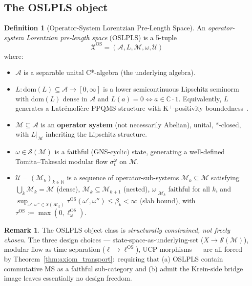 \documentclass[11pt,a4paper]{article}
\theoremstyle{plain}
\theoremstyle{definition}
\newtheorem{definition}[theorem]{Definition}
\newtheorem{remark}[theorem]{Remark}
\newcommand{\Acal}{\mathcal{A}}
\newcommand{\Scal}{\mathcal{S}}
\newcommand{\Mcal}{\mathcal{M}}
\newcommand{\Ucal}{\mathcal{U}}
\newcommand{\C}{\mathbb{C}}
\newcommand{\N}{\mathbb{N}}
\newcommand{\ellOS}{\ell^{\mathrm{OS}}}
\newcommand{\tauOS}{\tau^{\mathrm{OS}}}
\newcommand{\Xfrak}{\mathfrak{X}^{\mathrm{OS}}}
\begin{document}
\subsection{The OSLPLS object}\label{sec:oslpls_object}

\begin{definition}[Operator-System Lorentzian Pre-Length Space]
\label{def:oslpls_object}
An \emph{operator-system Lorentzian pre-length space} (OSLPLS) is a
5-tuple
\[
  \Xfrak = (\Acal,L,\Mcal,\omega,\Ucal)
\]
where:
\begin{itemize}
\item[\textbf{(A1)}] $\Acal$ is a separable unital C*-algebra (the
underlying algebra).
\item[\textbf{(A2)}] $L:\mathrm{dom}(L)\subseteq\Acal\to[0,\infty]$ is
a lower semicontinuous Lipschitz seminorm with $\mathrm{dom}(L)$ dense
in $\Acal$ and $L(a)=0\iff a\in\C\cdot 1$. Equivalently, $L$ generates
a Latr\'emoli\`ere PPQMS structure with K$^{+}$-positivity
boundedness~\cite{latremoliere2025_hypertopology, paper48}.
\item[\textbf{(A3)}] $\Mcal\subseteq\Acal$ is an \textbf{operator
system} (not necessarily Abelian), unital, *-closed, with $L|_{\Mcal}$
inheriting the Lipschitz structure.
\item[\textbf{(A4)}] $\omega\in\Scal(\Mcal)$ is a faithful (GNS-cyclic)
state, generating a well-defined Tomita--Takesaki modular flow
$\sigma_{t}^{\omega}$ on $\Mcal$.
\item[\textbf{(A5)}] $\Ucal=(\Mcal_{k})_{k\in\N}$ is a sequence of
operator-sub-systems $\Mcal_{k}\subseteq\Mcal$ satisfying
$\bigcup_{k}\Mcal_{k}=\Mcal$ (dense),
$\Mcal_{k}\subseteq\Mcal_{k+1}$ (nested), $\omega|_{\Mcal_{k}}$
faithful for all $k$, and $\sup_{\omega',\omega''\in\Scal(\Mcal_{k})}
\tauOS(\omega',\omega'')\le\beta_{k}<\infty$ (slab bound), with
$\tauOS:=\max(0,\ellOS_{\omega})$.
\end{itemize}
\end{definition}

\begin{remark}\label{rem:design_constraint}
The OSLPLS object class is \emph{structurally constrained, not freely
chosen}. The three design choices --- state-space-as-underlying-set
($X\to\Scal(\Mcal)$), modular-flow-as-time-separation
($\ell\to\ellOS$), UCP morphisms --- are all forced by
Theorem~\ref{thm:axiom_transport}:\ requiring that (a) OSLPLS contain
commutative MS as a faithful sub-category and (b) admit the
Krein-side bridge image leaves essentially no design freedom.
\end{remark}
\end{document}
